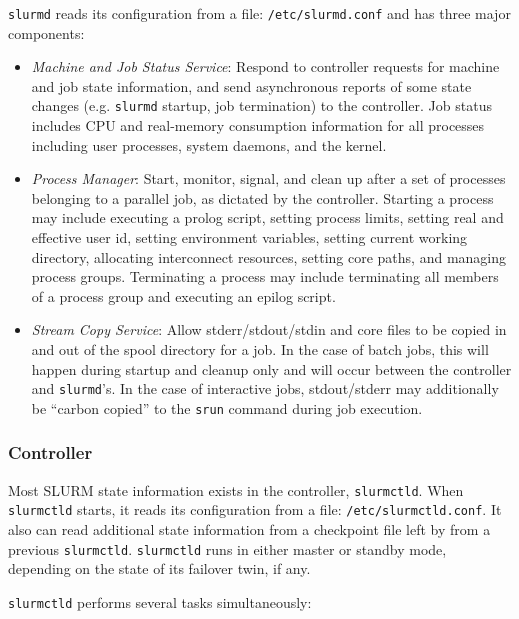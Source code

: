 {\tt slurmd} reads its configuration from a file: {\tt /etc/slurmd.conf}
and has three major components:

\begin{itemize}
\item {\em Machine and Job Status Service}:  Respond to controller 
requests for machine and job state information, and send asynchronous 
reports of some state changes (e.g. {\tt slurmd} startup, job 
termination) to the controller.
Job status includes CPU and real-memory consumption 
information for all processes including user processes, system daemons, 
and the kernel. 

\item{\em Process Manager}:  Start, monitor, signal, and clean up after
a set of processes belonging to a parallel job, as dictated by the
controller.  Starting a process may include executing a prolog script, 
setting process limits, setting real and effective user id, setting 
environment variables, setting current working directory, allocating 
interconnect resources, setting core paths, and managing process groups.  
Terminating a process may include terminating all members of a process 
group and executing an epilog script.

\item{\em Stream Copy Service}:  Allow stderr/stdout/stdin and core files
to be copied in and out of the spool directory for a job.  In the case
of batch jobs, this will happen during startup and cleanup only and will
occur between the controller and {\tt slurmd}'s.
In the case of interactive jobs, stdout/stderr may additionally be ``carbon 
copied'' to the {\tt srun} command during job execution.

\end{itemize}

\subsubsection{Controller}

Most SLURM state information exists in the controller, {\tt slurmctld}. 
When {\tt slurmctld} starts, it reads its configuration from a file:
{\tt /etc/slurmctld.conf}.  It also can read additional state information 
from a checkpoint file left by from a previous {\tt slurmctld}.
{\tt slurmctld} runs in either master or standby mode, depending
on the state of its failover twin, if any.  

{\tt slurmctld} performs several tasks simultaneously:

